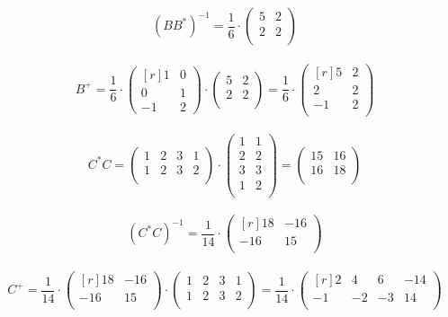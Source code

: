 \documentclass[12pt]{article}
\theoremstyle{definition}
\numberwithin{equation}{section}
\begin{document}
	\[(BB^*)^{-1} = \frac{1}{6} \cdot \begin{pmatrix}
	5 & 2 \\         
	2 & 2 \\
	\end{pmatrix}\]\\
	\[B^+ = \frac{1}{6} \cdot \begin{pmatrix}[r]
	1 & 0 \\         
	0 & 1 \\
	-1 & 2
	\end{pmatrix} \cdot \begin{pmatrix}
	5 & 2 \\         
	2 & 2 \\
	\end{pmatrix} = \frac{1}{6} \cdot \begin{pmatrix}[r]
	5 & 2 \\         
	2 & 2 \\
	-1 & 2 \\
	\end{pmatrix}\]\\
	\[C^*C = \begin{pmatrix}
	1 & 2 & 3 & 1 \\         
	1 & 2 & 3 & 2 \\
	\end{pmatrix} \cdot \begin{pmatrix}
	1 & 1 \\         
	2 & 2 \\
	3 & 3 \\
	1 & 2 \\
	\end{pmatrix} =  \begin{pmatrix}
	15 & 16 \\         
	16 & 18 \\
	\end{pmatrix}\]\\
	\[(C^*C)^{-1} = \frac{1}{14} \cdot \begin{pmatrix}[r]
	18 & -16 \\         
	-16 & 15 \\
	\end{pmatrix}\]\\
	\[C^+ = \frac{1}{14} \cdot \begin{pmatrix}[r]
	18 & -16 \\         
	-16 & 15 \\
	\end{pmatrix} \cdot \begin{pmatrix}
	1 & 2 & 3 & 1 \\         
	1 & 2 & 3 & 2 \\
	\end{pmatrix} = \frac{1}{14} \cdot \begin{pmatrix}[r]
	2 & 4 & 6 & -14 \\         
	-1 & -2 & -3 & 14 \\
	\end{pmatrix}\]\\
\end{document}
